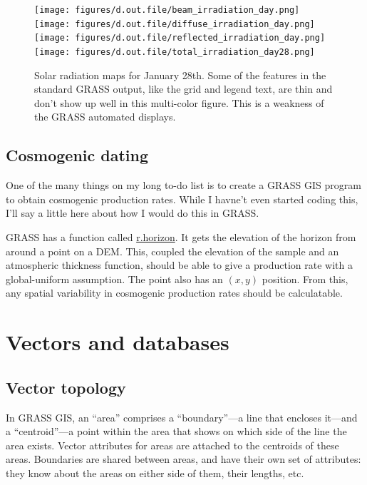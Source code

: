 \documentclass{book}
\begin{document}
\begin{figure}[h]
 \begin{center}
 \texttt{[image: figures/d.out.file/beam\_irradiation\_day.png]}
 \texttt{[image: figures/d.out.file/diffuse\_irradiation\_day.png]}
 \vspace{3mm}
 \texttt{[image: figures/d.out.file/reflected\_irradiation\_day.png]}
 \texttt{[image: figures/d.out.file/total\_irradiation\_day28.png]}
 \caption{Solar radiation maps for January 28th. Some of the features in the standard GRASS output, like the grid and legend text, are thin and don't show up well in this multi-color figure. This is a weakness of the GRASS automated displays.}
 \label{fig:rad}
 \end{center}
\end{figure}

\section{Cosmogenic dating}

One of the many things on my long to-do list is to create a GRASS GIS program to obtain cosmogenic production rates. While I havne't even started coding this, I'll say a little here about how I would do this in GRASS.

GRASS has a function called \url{r.horizon}. It gets the elevation of the horizon from around a point on a DEM. This, coupled the elevation of the sample and an atmospheric thickness function, should be able to give a production rate with a global-uniform assumption. The point also has an $(x,y)$ position. From this, any spatial variability in cosmogenic production rates should be calculatable.

\chapter{Vectors and databases \label{s:vector}}

\section{Vector topology}

In GRASS GIS, an ``area'' comprises a ``boundary''---a line that encloses it---and a ``centroid''---a point within the area that shows on which side of the line the area exists. Vector attributes for areas are attached to the centroids of these areas. Boundaries are shared between areas, and have their own set of attributes: they know about the areas on either side of them, their lengths, etc.
\end{document}
